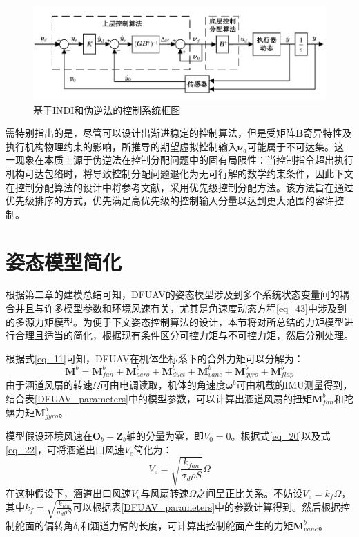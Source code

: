 \begin{figure}[htbp]
	\centering
	\begin{minipage}[c]{1\textwidth}
		\centering
		\includegraphics[scale=1]{Fig/理论框图.pdf}
		\caption{\label{理论框图}基于INDI和伪逆法的控制系统框图}
	\end{minipage}%
\end{figure}

需特别指出的是，尽管可以设计出渐进稳定的控制算法，但是受矩阵$\boldsymbol{B}$奇异特性及执行机构物理约束的影响，所推导的期望虚拟控制输入$\boldsymbol{\nu}_d$可能属于不可达集。这一现象在本质上源于伪逆法在控制分配问题中的固有局限性：当控制指令超出执行机构可达包络时，将导致控制分配问题退化为无可行解的数学约束条件，因此下文在控制分配算法的设计中将参考文献\parencite{HKXB202010026}，采用优先级控制分配方法。该方法旨在通过优先级排序的方式，优先满足高优先级的控制输入分量以达到更大范围的容许控制。

\section{姿态模型简化}

根据第二章的建模总结可知，DFUAV的姿态模型涉及到多个系统状态变量间的耦合并且与许多模型参数和环境风速有关，尤其是角速度动态方程\eqref{eq_43}中涉及到的多源力矩模型。为便于下文姿态控制算法的设计，本节将对所总结的力矩模型进行合理且适当的简化，根据现有条件区分可控力矩与不可控力矩，然后分别处理。

根据式\ref{eq_11}可知，DFUAV在机体坐标系下的合外力矩可以分解为：
\begin{equation}
    \boldsymbol{M}^b=\boldsymbol{M}_{fan}^b+\boldsymbol{M}_{aero}^b+\boldsymbol{M}_{duct}^b+\boldsymbol{M}_{vane}^b+\boldsymbol{M}_{gyro}^b+\boldsymbol{M}_{flap}^b
    \label{3-13}
\end{equation}
由于涵道风扇的转速$\Omega$可由电调读取，机体的角速度$\boldsymbol\omega^b$可由机载的IMU测量得到，结合表\ref{DFUAV_parameters}中的模型参数，可以计算出涵道风扇的扭矩$\boldsymbol{M}_{fan}^b$和陀螺力矩$\boldsymbol{M}_{gyro}^b$。

模型假设环境风速在$\boldsymbol{O}_b-\boldsymbol{Z}_b$轴的分量为零，即$V_0=0$。根据式\ref{eq_20}以及式\ref{eq_22}，可将涵道出口风速$V_{e}$简化为：
\begin{equation}
    V_e=\sqrt{\frac{k_{fan}}{\sigma_d\rho S}}\Omega    \label{3-14}
\end{equation}
在这种假设下，涵道出口风速$V_{e}$与风扇转速$\Omega$之间呈正比关系。不妨设$V_e=k_{f}\Omega$，其中$k_{f}=\sqrt{\frac{k_{fan}}{\sigma_d\rho S}}$可以根据表\ref{DFUAV_parameters}中的参数计算得到。然后根据控制舵面的偏转角$\delta_{i}$和涵道力臂的长度，可计算出控制舵面产生的力矩$\boldsymbol{M}_{vane}^b$。

